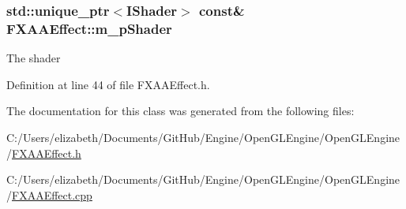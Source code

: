 \subsubsection[{\texorpdfstring{m\+\_\+p\+Shader}{m_pShader}}]{\setlength{\rightskip}{0pt plus 5cm}std\+::unique\+\_\+ptr$<${\bf I\+Shader}$>$ const\& F\+X\+A\+A\+Effect\+::m\+\_\+p\+Shader\hspace{0.3cm}{\ttfamily [private]}}\hypertarget{class_f_x_a_a_effect_ad80cc67deda40415c1944b6b6bad9895}{}\label{class_f_x_a_a_effect_ad80cc67deda40415c1944b6b6bad9895}


The shader 



Definition at line 44 of file F\+X\+A\+A\+Effect.\+h.



The documentation for this class was generated from the following files\+:\begin{DoxyCompactItemize}
\item 
C\+:/\+Users/elizabeth/\+Documents/\+Git\+Hub/\+Engine/\+Open\+G\+L\+Engine/\+Open\+G\+L\+Engine/\hyperlink{_f_x_a_a_effect_8h}{F\+X\+A\+A\+Effect.\+h}\item 
C\+:/\+Users/elizabeth/\+Documents/\+Git\+Hub/\+Engine/\+Open\+G\+L\+Engine/\+Open\+G\+L\+Engine/\hyperlink{_f_x_a_a_effect_8cpp}{F\+X\+A\+A\+Effect.\+cpp}\end{DoxyCompactItemize}
